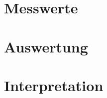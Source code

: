 \section{Messwerte}
\label{chap:VERSUCH_3_MESSWERTE}

\section{Auswertung}
\label{chap:VERSUCH_3_AUSWERTUNG}

\section{Interpretation}
\label{chap:VERSUCH_3_INTERPRETATION}